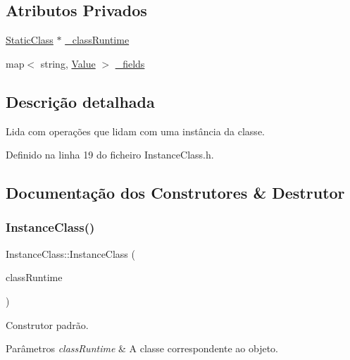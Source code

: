 \subsection*{Atributos Privados}
\begin{DoxyCompactItemize}
\item 
\hyperlink{classStaticClass}{Static\+Class} $\ast$ \hyperlink{classInstanceClass_aa8ed961b694f26f470dc2399532d3538}{\+\_\+class\+Runtime}
\item 
map$<$ string, \hyperlink{structValue}{Value} $>$ \hyperlink{classInstanceClass_a603a0866f5113d16ff8f80b5d6bf152b}{\+\_\+fields}
\end{DoxyCompactItemize}


\subsection{Descrição detalhada}
Lida com operações que lidam com uma instância da classe. 

Definido na linha 19 do ficheiro Instance\+Class.\+h.



\subsection{Documentação dos Construtores \& Destrutor}
\mbox{\label{classInstanceClass_a86ab031eb0f0240b0a54423003000322}} 
\subsubsection{\texorpdfstring{Instance\+Class()}{InstanceClass()}}
{\footnotesize\ttfamily Instance\+Class\+::\+Instance\+Class (\begin{DoxyParamCaption}\item[{\hyperlink{classStaticClass}{Static\+Class} $\ast$}]{class\+Runtime }\end{DoxyParamCaption})}



Construtor padrão. 


\begin{DoxyParams}{Parâmetros}
{\em class\+Runtime} & A classe correspondente ao objeto. \\
\hline
\end{DoxyParams}


